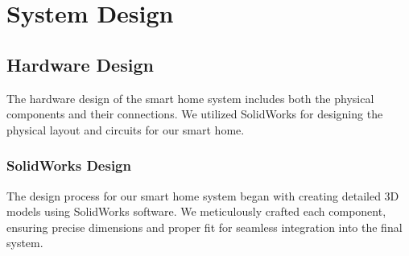 \section{System Design}

\subsection{Hardware Design}
The hardware design of the smart home system includes both the physical components and their connections. We utilized SolidWorks for designing the physical layout and circuits for our smart home.

\subsubsection{SolidWorks Design}
The design process for our smart home system began with creating detailed 3D models using SolidWorks software. We meticulously crafted each component, ensuring precise dimensions and proper fit for seamless integration into the final system.

